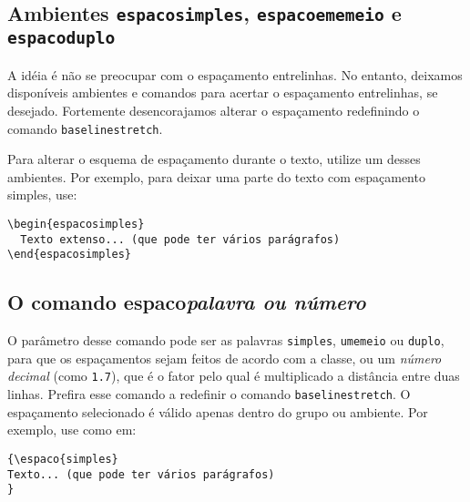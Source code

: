 \documentclass[espaco=simples,appendix=Name]{abnt}
\newcommand{\ac}{\symbol{123}}  %
\newcommand{\fc}{\symbol{125}}  %
\newcommand{\bs}{\symbol{92}}   %
\begin{document}
\subsection*{Ambientes \texttt{espacosimples}, \texttt{espacoememeio} e  \texttt{espacoduplo}} 

A idéia é não se preocupar com o espaçamento entrelinhas. No entanto,
deixamos disponíveis ambientes e comandos para acertar o espaçamento
entrelinhas, se desejado. Fortemente desencorajamos alterar o espaçamento
redefinindo o comando \texttt{\bs baselinestretch}. 

Para alterar o esquema de espaçamento durante o texto, utilize um desses
ambientes. Por exemplo, para deixar uma parte do texto com espaçamento
simples, use: 
\begin{verbatim}
\begin{espacosimples}
  Texto extenso... (que pode ter vários parágrafos)
\end{espacosimples}
\end{verbatim}

\subsection*{O comando {\bs espaco\ac\textit{palavra ou número}\fc}}

O parâmetro desse comando pode ser as palavras \texttt{simples},
\texttt{umemeio} ou \texttt{duplo}, para que os espaçamentos sejam feitos
de acordo com a classe, ou um \emph{número decimal} (como \texttt{1.7}),
que é o fator pelo qual é multiplicado a distância entre duas
linhas. Prefira esse comando a redefinir o comando
\texttt{\bs baselinestretch}. O espaçamento selecionado é válido apenas
dentro do grupo ou ambiente. Por exemplo, use como em: 

\begin{verbatim}
{\espaco{simples}
Texto... (que pode ter vários parágrafos)
}
\end{verbatim}


\end{document}
